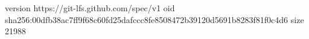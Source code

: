 version https://git-lfs.github.com/spec/v1
oid sha256:00dfb38ac7ff9f68c60fd25dafccc8fe8508472b39120d5691b8283f81f0c4d6
size 21988
